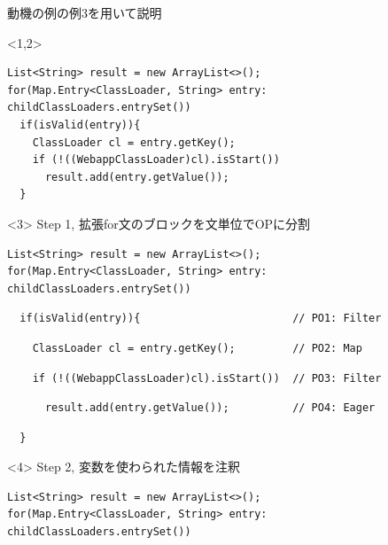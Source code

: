 \begin{frame}[fragile]{動機の例の例3を用いて説明}

\begin{onlyenv}<1,2>
\begin{lstlisting}
List<String> result = new ArrayList<>();
for(Map.Entry<ClassLoader, String> entry: childClassLoaders.entrySet())
  if(isValid(entry)){
    ClassLoader cl = entry.getKey();
    if (!((WebappClassLoader)cl).isStart())
      result.add(entry.getValue());
  }
\end{lstlisting}
\end{onlyenv}
\begin{onlyenv}<3>
Step 1, 拡張for文のブロックを文単位でOPに分割
\begin{lstlisting}
List<String> result = new ArrayList<>();
for(Map.Entry<ClassLoader, String> entry: childClassLoaders.entrySet())
\end{lstlisting}
\begin{lstlisting}
  if(isValid(entry)){                        // PO1: Filter
\end{lstlisting}
\begin{lstlisting}
    ClassLoader cl = entry.getKey();         // PO2: Map
\end{lstlisting}
\begin{lstlisting}
    if (!((WebappClassLoader)cl).isStart())  // PO3: Filter
\end{lstlisting}
\begin{lstlisting}
      result.add(entry.getValue());          // PO4: Eager
\end{lstlisting}
\begin{lstlisting}
  }
\end{lstlisting}
\end{onlyenv}
\begin{onlyenv}<4>
Step 2, 変数を使わられた情報を注釈
\begin{lstlisting}
List<String> result = new ArrayList<>();
for(Map.Entry<ClassLoader, String> entry: childClassLoaders.entrySet())

\end{lstlisting}
\end{onlyenv}
\end{frame}
